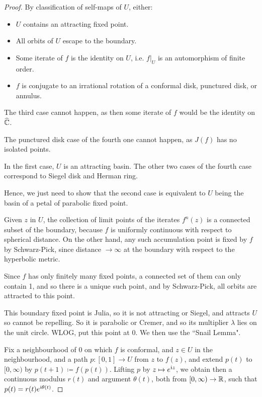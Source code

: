 \documentclass[10pt,a4paper]{article}
\begin{document}
\begin{proof}
  By classification of self-maps of $U$, either:
  \begin{itemize}
    \item $U$ contains an attracting fixed point.
    \item All orbits of $U$ escape to the boundary.
    \item Some iterate of $f$ is the identity on $U$, i.e. $f|_U$ is an automorphism of finite order.
    \item $f$ is conjugate to an irrational rotation of a conformal disk, punctured disk, or annulus.
  \end{itemize}
  The third case cannot happen, as then some iterate of $f$ would be the identity on $\widehat{\mathbb{C}}$.

  The punctured disk case of the fourth one cannot happen, as $J(f)$ has no isolated points.

  In the first case, $U$ is an attracting basin. The other two cases of the fourth case correspond to Siegel disk and Herman ring.

  Hence, we just need to show that the second case is equivalent to $U$ being the basin of a petal of parabolic fixed point.

  Given $z$ in $U$, the collection of limit points of the iterates $f^n(z)$ is a connected subset of the boundary, because $f$ is uniformly continuous with respect to spherical distance. On the other hand, any such accumulation point is fixed by $f$ by Schwarz-Pick, since distance $\to \infty$ at the boundary with respect to the hyperbolic metric.

  Since $f$ has only finitely many fixed points, a connected set of them can only contain 1, and so there is a unique such point, and by Schwarz-Pick, all orbits are attracted to this point.

  This boundary fixed point is Julia, so it is not attracting or Siegel, and attracts $U$ so cannot be repelling. So it is parabolic or Cremer, and so its multiplier $\lambda$ lies on the unit circle. WLOG, put this point at 0. We then use the ``Snail Lemma".

  Fix a neighbourhood of $0$ on which $f$ is conformal, and $z \in U$ in the neighbourhood, and a path $p:[0,1] \to U$ from $z$ to $f(z)$, and extend $p(t)$ to $[0, \infty)$ by $p(t+1) \coloneqq f(p(t))$. Lifting $p$ by $z \mapsto e^{\mathfrak{i} z}$, we obtain then a continuous modulus $r(t)$ and argument $\theta(t)$, both from $[0, \infty) \to \mathbb{R}$, such that $p(t) = r(t)e^{\mathfrak{i}\theta(t)}$.


\end{proof}
\end{document}
